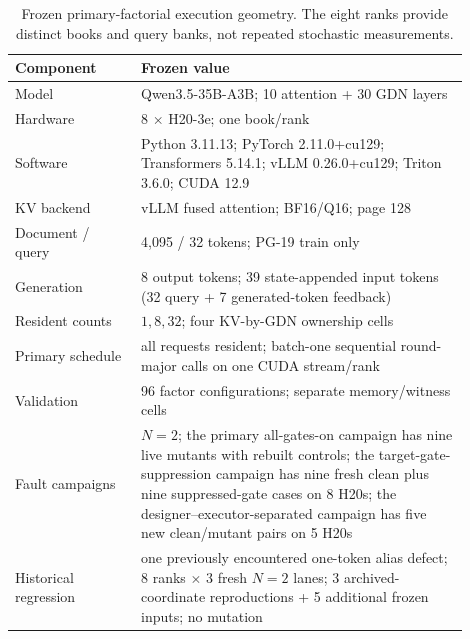 \documentclass{article}
\begin{document}
\begin{table}[H]
  \caption{Frozen primary-factorial execution geometry.  The eight ranks
  provide distinct books and query banks, not repeated stochastic
  measurements.}
  \label{tab:protocol}
  \centering
  \small
  \begin{tabular}{@{}p{0.25\linewidth}p{0.65\linewidth}@{}}
    \toprule
    Component & Frozen value \\
    \midrule
    Model & Qwen3.5-35B-A3B; 10 attention + 30 GDN layers \\
    Hardware & 8 $\times$ H20-3e; one book/rank \\
    Software & Python 3.11.13; PyTorch 2.11.0+cu129; Transformers 5.14.1; vLLM 0.26.0+cu129; Triton 3.6.0; CUDA 12.9 \\
    KV backend & vLLM fused attention; BF16/Q16; page 128 \\
    Document / query & 4,095 / 32 tokens; PG-19 train only \\
    Generation & 8 output tokens; 39 state-appended input tokens (32 query + 7 generated-token feedback) \\
    Resident counts & $1,8,32$; four KV-by-GDN ownership cells \\
    Primary schedule & all requests resident; batch-one sequential round-major calls on one CUDA stream/rank \\
    Validation & 96 factor configurations; separate memory/witness cells \\
    Fault campaigns & $N=2$; the primary all-gates-on campaign has nine live mutants with rebuilt controls; the target-gate-suppression campaign has nine fresh clean plus nine suppressed-gate cases on 8 H20s; the designer--executor-separated campaign has five new clean/mutant pairs on 5 H20s \\
    Historical regression & one previously encountered one-token alias defect; 8 ranks $\times$ 3 fresh $N=2$ lanes; 3 archived-coordinate reproductions + 5 additional frozen inputs; no mutation \\
    \bottomrule
  \end{tabular}
\end{table}
\end{document}
